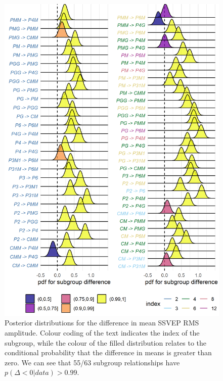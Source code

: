 \documentclass[11pt, twoside]{article}
\begin{document}
\begin{figure}[hp]
\centering
\includegraphics[width=0.75\linewidth]{../analysis/plots/subgroup_comp_eeg_rms.png}
\caption{Posterior distributions for the difference in mean SSVEP RMS amplitude. Colour coding of the text indicates the index of the subgroup, while the colour of the filled distribution relates to the conditional probability that the difference in means is greater than zero. We can see that 55/63 subgroup relationships have $p(\Delta <0 | data)>0.99$.}
\label{fig:eeg_comp}
\end{figure}
\end{document}
